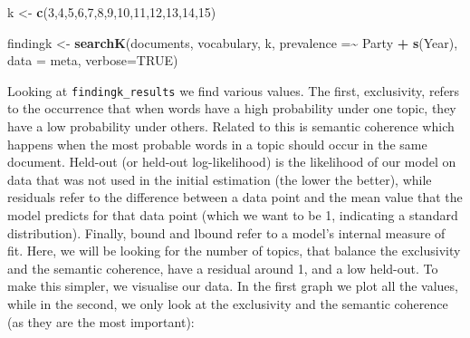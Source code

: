\documentclass[
]{book}
\newenvironment{Shaded}{\begin{snugshade}}{\end{snugshade}}
\newcommand{\AttributeTok}[1]{\textcolor[rgb]{0.13,0.29,0.53}{#1}}
\newcommand{\ConstantTok}[1]{\textcolor[rgb]{0.56,0.35,0.01}{#1}}
\newcommand{\DecValTok}[1]{\textcolor[rgb]{0.00,0.00,0.81}{#1}}
\newcommand{\FunctionTok}[1]{\textcolor[rgb]{0.13,0.29,0.53}{\textbf{#1}}}
\newcommand{\NormalTok}[1]{#1}
\newcommand{\OtherTok}[1]{\textcolor[rgb]{0.56,0.35,0.01}{#1}}
\newcommand{\SpecialCharTok}[1]{\textcolor[rgb]{0.81,0.36,0.00}{\textbf{#1}}}
\begin{document}
\begin{Shaded}
\begin{Highlighting}[]
\NormalTok{k }\OtherTok{\textless{}{-}} \FunctionTok{c}\NormalTok{(}\DecValTok{3}\NormalTok{,}\DecValTok{4}\NormalTok{,}\DecValTok{5}\NormalTok{,}\DecValTok{6}\NormalTok{,}\DecValTok{7}\NormalTok{,}\DecValTok{8}\NormalTok{,}\DecValTok{9}\NormalTok{,}\DecValTok{10}\NormalTok{,}\DecValTok{11}\NormalTok{,}\DecValTok{12}\NormalTok{,}\DecValTok{13}\NormalTok{,}\DecValTok{14}\NormalTok{,}\DecValTok{15}\NormalTok{)}
\end{Highlighting}
\end{Shaded}

\begin{Shaded}
\begin{Highlighting}[]
\NormalTok{findingk }\OtherTok{\textless{}{-}} \FunctionTok{searchK}\NormalTok{(documents, vocabulary, k, }\AttributeTok{prevalence =}\SpecialCharTok{\textasciitilde{}}\NormalTok{ Party }\SpecialCharTok{+} \FunctionTok{s}\NormalTok{(Year), }\AttributeTok{data =}\NormalTok{ meta, }\AttributeTok{verbose=}\ConstantTok{TRUE}\NormalTok{)}
\end{Highlighting}
\end{Shaded}

\begin{Shaded}
\end{Shaded}

Looking at \texttt{findingk\_results} we find various values. The first, exclusivity, refers to the occurrence that when words have a high probability under one topic, they have a low probability under others. Related to this is semantic coherence which happens when the most probable words in a topic should occur in the same document. Held-out (or held-out log-likelihood) is the likelihood of our model on data that was not used in the initial estimation (the lower the better), while residuals refer to the difference between a data point and the mean value that the model predicts for that data point (which we want to be 1, indicating a standard distribution). Finally, bound and lbound refer to a model's internal measure of fit. Here, we will be looking for the number of topics, that balance the exclusivity and the semantic coherence, have a residual around 1, and a low held-out. To make this simpler, we visualise our data. In the first graph we plot all the values, while in the second, we only look at the exclusivity and the semantic coherence (as they are the most important):
\end{document}
